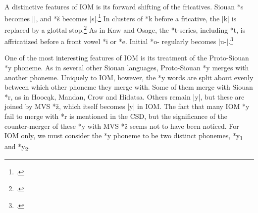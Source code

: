 \documentclass[output=paper]{LSP/langsci}
\begin{document}
A distinctive features of IOM is its forward shifting of the fricatives.  Siouan *s becomes ||, and *š becomes |s|.\footnote{\citealt[245]{Rankinetal2006PDF}. } In clusters of *k before a fricative, the |k| is replaced by a glottal stop.\footnote{\citealt[857]{Rankinetal2006PDF}.}  As in Kaw and Osage, the *t-series, including *t\textsuperscript{}, is affricatized before a front vowel *i or *e.  Initial *o- regularly becomes |u-|.\footnote{\citealt[893]{Rankinetal2006PDF}.}

One of the most interesting features of IOM is its treatment of the Proto-Siouan *y phoneme.  As in several other Siouan languages, Proto-Siouan *y merges with another phoneme.  Uniquely to IOM, however, the *y words are split about evenly between which other phoneme they merge with.  Some of them merge with Siouan *r, as in Hooc\k{a}k, Mandan, Crow and Hidatsa.  Others remain |y|, but these are joined by MVS *\v{z}, which itself becomes |y| in IOM.  The fact that many IOM *y fail to merge with *r is mentioned in the CSD, but the significance of the counter-merger of these *y with MVS *\v{z} seems not to have been noticed.  For IOM only, we must consider the *y phoneme to be two distinct phonemes, *y\textsubscript{1} and *y\textsubscript{2}.
\end{document}
